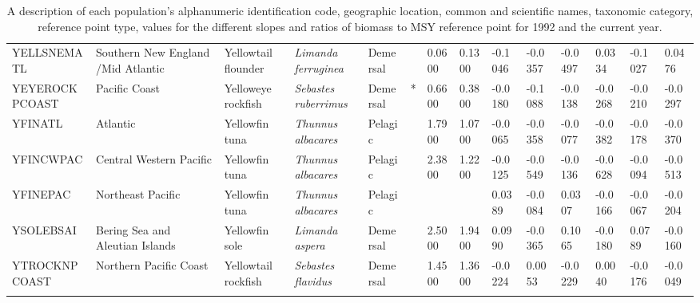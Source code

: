 \begin{longtable}{p{2.6cm}p{1.9cm}p{1.7cm}p{1.6cm}p{1cm}p{0.3cm}p{1cm}p{1cm}p{1cm}p{1.1cm}p{1cm}p{1.1cm}p{1cm}p{1.1cm}}
  YELLSNEMATL & Southern New England /Mid Atlantic & Yellowtail flounder & \textit{Limanda ferruginea} & Demersal &   & 0.0600 & 0.1300 & -0.1046 & -0.0357 & -0.0497 & 0.0334 & -0.1027 & 0.0476 \\ 
  YEYEROCKPCOAST & Pacific Coast & Yelloweye rockfish & \textit{Sebastes ruberrimus} & Demersal & * & 0.6600 & 0.3800 & -0.0180 & -0.1088 & -0.0138 & -0.0268 & -0.0210 & -0.0297 \\ 
  YFINATL & Atlantic & Yellowfin tuna & \textit{Thunnus albacares} & Pelagic &   & 1.7900 & 1.0700 & -0.0065 & -0.0358 & -0.0077 & -0.0382 & -0.0178 & -0.0370 \\ 
  YFINCWPAC & Central Western Pacific & Yellowfin tuna & \textit{Thunnus albacares} & Pelagic &   & 2.3800 & 1.2200 & -0.0125 & -0.0549 & -0.0136 & -0.0628 & -0.0094 & -0.0513 \\ 
  YFINEPAC & Northeast Pacific & Yellowfin tuna & \textit{Thunnus albacares} & Pelagic &  &  &  & 0.0389 & -0.0084 & 0.0307 & -0.0166 & -0.0067 & -0.0204 \\ 
  YSOLEBSAI & Bering Sea and Aleutian Islands & Yellowfin sole & \textit{Limanda aspera} & Demersal &   & 2.5000 & 1.9400 & 0.0990 & -0.0365 & 0.1065 & -0.0180 & 0.0789 & -0.0160 \\ 
  YTROCKNPCOAST & Northern Pacific Coast & Yellowtail rockfish & \textit{Sebastes flavidus} & Demersal &   & 1.4500 & 1.3600 & -0.0224 & 0.0053 & -0.0229 & 0.0040 & -0.0176 & -0.0049 \\ 
   \hline
\hline
\caption{A description of each population's alphanumeric identification code, geographic location, common and scientific names, taxonomic category, reference point type, values for the different slopes and ratios of biomass to MSY reference point for 1992 and the current year.}
\label{tab:S1}
\end{longtable}
